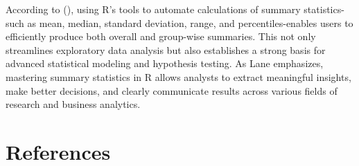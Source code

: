 \documentclass[
  man,
  floatsintext,
  longtable,
  nolmodern,
  notxfonts,
  notimes,
  colorlinks=true,linkcolor=blue,citecolor=blue,urlcolor=blue]{apa7}
\begin{document}
According to (), using R's
tools to automate calculations of summary statistics-such as mean,
median, standard deviation, range, and percentiles-enables users to
efficiently produce both overall and group-wise summaries. This not only
streamlines exploratory data analysis but also establishes a strong
basis for advanced statistical modeling and hypothesis testing. As Lane
emphasizes, mastering summary statistics in R allows analysts to extract
meaningful insights, make better decisions, and clearly communicate
results across various fields of research and business analytics.

\newpage

\section{References}\label{references}
\end{document}
